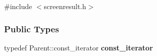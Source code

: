 \hypertarget{classapex_1_1_screen_result}{
\label{classapex_1_1_screen_result}
}


{\ttfamily \#include $<$screenresult.\-h$>$}

\subsubsection*{Public Types}
\begin{DoxyCompactItemize}
\item
\hypertarget{classapex_1_1_screen_result_a5bea93bb9c5682835e4f269a9f019c01}{typedef Parent\-::const\-\_\-iterator {\bfseries const\-\_\-iterator}}\label{classapex_1_1_screen_result_a5bea93bb9c5682835e4f269a9f019c01}

\end{DoxyCompactItemize}
